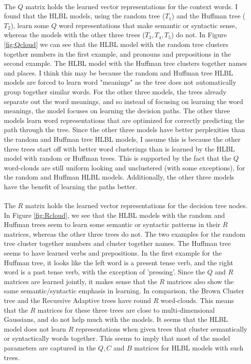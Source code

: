 \paragraph{}
The $Q$ matrix holds the learned vector representations for the context words. I found that the HLBL models, using the random tree ($T_1$) and the Huffman tree ($T_2$), learn some $Q$ word representations that make semantic or syntactic sense, whereas the models with the other three trees ($T_3,T_4,T_5$) do not. In Figure \ref{fig:Qcloud} we can see that the HLBL model with the random tree clusters together numbers in the first example, and pronouns and prepositions in the second example. The HLBL model with the Huffman tree clusters together names and places. I think this may be because the random and Huffman tree HLBL models are forced to learn word "meanings" as the tree does not automatically group together similar words. For the other three models, the trees already separate out the word meanings, and so instead of focusing on learning the word meanings, the model focuses on learning the decision paths. The other three models learn word representations that are optimized for correctly predicting the path through the tree. Since the other three models have better perplexities than the random and Huffman tree HLBL models, I assume this is because the other three trees start off with better word clusterings than is learned by the HLBL model with random or Huffman trees. This is supported by the fact that the $Q$ word-clouds are still uniform looking and unclustered (with some exceptions), for the random and Huffman HLBL models. Additionally, the other three models have the benefit of learning the paths better.
\paragraph{}
The $R$ matrix holds the learned vector representations for the decision tree nodes. In Figure \ref{fig:Rcloud}, we see that the HLBL models with the random and Huffman trees seem to learn some semantic or syntactic patterns in their $R$ matrices, whereas the other three trees do not. The two examples for the random tree cluster together numbers and cluster together names. The Huffman tree seems to have learned verbs and prepositions. In the first example for the Huffman tree, it looks like the left word is a present tense verb, and the right word is a past tense verb, with the exception of 'pressing'. Since the $Q$ and $R$ matrices are learned jointly, it makes sense that the $R$ matrices also show the same semantic/syntactic emphasis in learning. In comparison, the Brown Cluster tree and the Recursive Adaptive trees have round $R$ word-clouds. This means that the $R$ matrices for these three trees are close to multi-dimensional Gaussians, and do not help much with the models. It seems that the HLBL model does not learn $R$ representations when given trees that cluster semantically or syntactically words together. This seems to imply that most of the model parameters are captured in the $Q, C$ and $B$ matrices for HLBL models with such trees.

